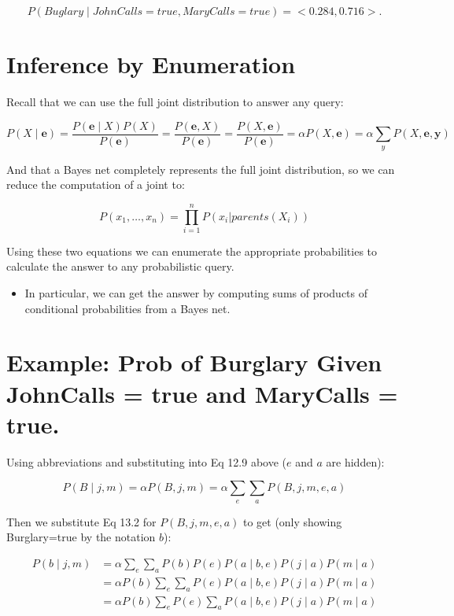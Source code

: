 \documentclass[11pt]{article}
\begin{document}
\begin{equation*}
P(Buglary \mid JohnCalls = true, MaryCalls = true) = <0.284, 0.716>.
\end{equation*}
\section{Inference by Enumeration}
\label{sec:org32caacc}

Recall that we can use the full joint distribution to answer any query:

\begin{equation*}
P(X \mid \bm{e})
= \frac{P(\bm{e} \mid X) P(X)}{P(\bm{e})}
= \frac{P(\bm{e}, X)}{P(\bm{e})}
= \frac{P(X, \bm{e})}{P(\bm{e})}
= \alpha P(X, \bm{e})
= \alpha \sum_y P(X, \bm{e}, \bm{y}) \tag{12.9}
\end{equation*}


And that a Bayes net completely represents the full joint distribution, so we can reduce the computation of a joint to:

\begin{equation*}
P(x_1, \dots, x_n) = \prod_{i=1}^n P( x_i | parents(X_i)) \tag{13.2}
\end{equation*}

Using these two equations we can enumerate the appropriate probabilities to calculate the answer to any probabilistic query.

\begin{itemize}
\item In particular, we can get the answer by computing sums of products of conditional probabilities from a Bayes net.
\end{itemize}
\section{Example: Prob of Burglary Given JohnCalls = true and MaryCalls = true.}
\label{sec:orgd188b85}

Using abbreviations and substituting into Eq 12.9 above (\(e\) and \(a\) are hidden):

\[
P(B \mid j, m) = \alpha P(B, j, m) = \alpha \sum_e \sum_a P(B, j, m, e, a)
\]

Then we substitute Eq 13.2 for \(P(B, j, m, e, a)\) to get (only showing Burglary=true by the notation \(b\)):

\vspace{-.1in}
\begin{align*}
P(b \mid j, m) &= \alpha \sum_e \sum_a P(b) P(e) P(a \mid b, e) P(j \mid a) P(m \mid a) \tag{1}\\
                &= \alpha P(b) \sum_e \sum_a P(e) P(a \mid b, e) P(j \mid a) P(m \mid a) \tag{2}\\
                &= \alpha P(b) \sum_e P(e) \sum_a P(a \mid b, e) P(j \mid a) P(m \mid a) \tag{3}
\end{align*}
\vspace{-.1in}
\end{document}
